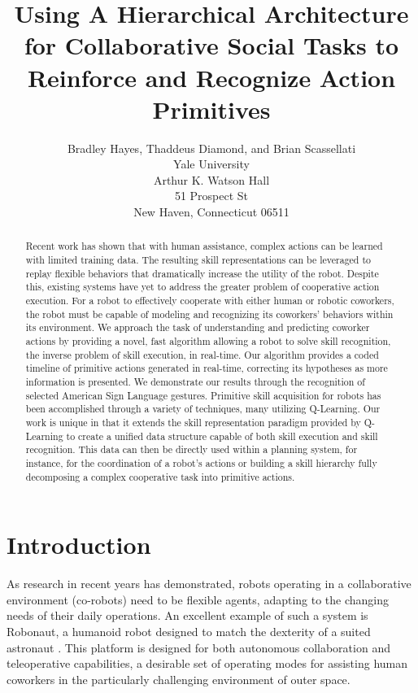 \documentclass[letterpaper]{article}
\begin{document}
\title{Using A Hierarchical Architecture for Collaborative Social Tasks to Reinforce and Recognize Action Primitives}
\author{Bradley Hayes, Thaddeus Diamond, and Brian Scassellati\\
Yale University\\
Arthur K. Watson Hall\\
51 Prospect St\\
New Haven, Connecticut 06511\\
}

\maketitle

\begin{abstract}
 Recent work has shown that with human
assistance, complex actions can be learned with limited training data. The
resulting skill representations can be leveraged to replay flexible behaviors
that dramatically increase the utility of the robot. Despite this, existing
systems have yet to address the greater problem of cooperative action execution.
For a robot to effectively cooperate with either human or robotic coworkers,
the robot must be capable of modeling and recognizing its
coworkers' behaviors within its environment. We approach the task of
understanding and predicting coworker actions by providing a novel, fast algorithm
allowing a robot to solve skill recognition, the inverse problem of skill execution,
in real-time. Our algorithm provides a coded timeline of
primitive actions generated in real-time, correcting its hypotheses as more
information is presented. We demonstrate our results through the recognition of selected
American Sign Language gestures. Primitive skill acquisition for robots has been
accomplished through a variety of techniques, many utilizing Q-Learning. 
Our work is unique in that it extends the skill representation paradigm provided
by Q-Learning to create a unified data structure capable of both skill execution
and skill recognition.  This data can then be directly used within a planning
system, for instance, for the coordination of a robot's
actions or building a skill hierarchy fully decomposing a complex cooperative 
task into primitive actions.
\end{abstract}

\section{Introduction}
\label{sec:intro}
	As research in recent years has demonstrated, robots operating in a collaborative environment (co-robots) need to be flexible agents, adapting to the changing needs of their daily operations. An excellent example of such a system is Robonaut, a humanoid robot designed to match the dexterity of a suited astronaut \cite{Robonaut}. This platform is designed for both autonomous collaboration and teleoperative capabilities, a desirable set of operating modes for assisting human coworkers in the particularly challenging environment of outer space.
	
\end{document}
